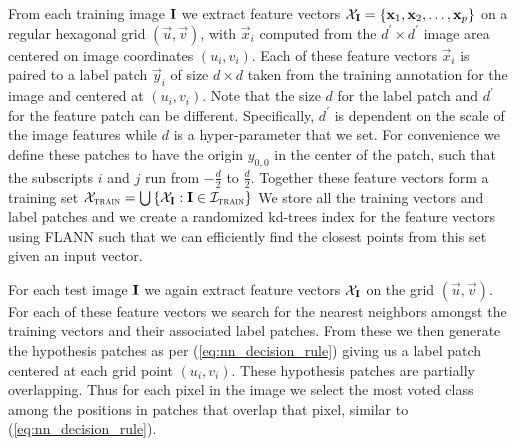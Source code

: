 From each training image $\mathbf{I}$ we extract feature vectors $\mathcal{X}_{\mathbf{I}} = \left\{ \mathbf{x}_1, \mathbf{x}_2, \ldots, \mathbf{x}_p \right\}$ on a regular hexagonal grid $(\vec{u}, \vec{v})$, with $\vec{x}_i$ computed from the $d^\prime \times d^\prime$ image area centered on image coordinates $(u_i, v_i)$. Each of these feature vectors $\vec{x}_i$ is paired to a label patch $\vec{y}_i$ of size $d \times d$ taken from the training annotation for the image and centered at $(u_i, v_i)$. Note that the size $d$ for the label patch and $d^\prime$ for the feature patch can be different. Specifically, $d^\prime$ is dependent on the scale of the image features while $d$ is a hyper-parameter that we set. For convenience we define these patches to have the origin $y_{0,0}$ in the center of the patch, such that the subscripts $i$ and $j$ run from $-\tfrac{d}{2}$ to $\tfrac{d}{2}$. Together these feature vectors form a training set $\mathcal{X}_\textsc{train} = \bigcup\left\{\mathcal{X}_{\mathbf{I}}: \mathbf{I} \in \mathcal{I}_\textsc{train} \right\}$ We store all the training vectors and label patches and we create a randomized kd-trees index for the feature vectors using FLANN \cite{muja2009fast} such that we can efficiently find the closest points from this set given an input vector.

For each test image $\mathbf{I}$ we again extract feature vectors $\mathcal{X}_{\mathbf{I}}$ on the grid $(\vec{u}, \vec{v})$. For each of these feature vectors we search for the nearest neighbors amongst the training vectors and their associated label patches. From these we then generate the hypothesis patches as per (\ref{eq:nn_decision_rule}) giving us a label patch centered at each grid point $(u_i, v_i)$. These hypothesis patches are partially overlapping. Thus for each pixel in the image we select the most voted class among the positions in patches that overlap that pixel, similar to (\ref{eq:nn_decision_rule}).

